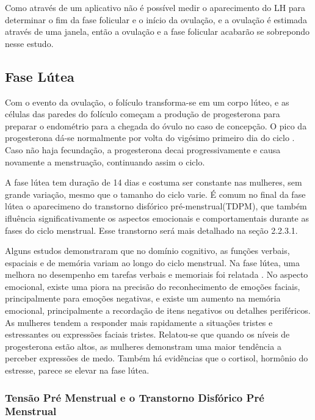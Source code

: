 Como através de um aplicativo não é possível medir o aparecimento do LH 
para determinar o fim da fase folicular e o início da ovulação, 
e a ovulação é estimada através de uma janela, então a ovulação e a fase 
folicular acabarão se sobrepondo nesse estudo.

\subsection{Fase Lútea}

Com o evento da ovulação, o folículo transforma-se em um corpo lúteo, e as 
células das paredes do folículo começam a produção de progesterona para 
preparar o endométrio para a chegada do óvulo no caso de concepção. 
O pico da progesterona dá-se normalmente por volta do vigésimo primeiro 
dia do ciclo \cite{nikas2003}. Caso não haja fecundação, a progesterona 
decai progressivamente e causa novamente a menstruação, continuando assim 
o ciclo.

A fase lútea tem duração de 14 dias e costuma ser constante nas mulheres, 
sem grande variação, mesmo que o tamanho do ciclo varie. É comum no final 
da fase lútea o aparecimeno do transtorno disfórico pré-menstrual(TDPM), 
que também ifluência significativamente os aspectos emocionais e 
comportamentais durante as fases do ciclo menstrual. Esse transtorno 
será mais detalhado na seção 2.2.3.1.

Alguns estudos demonstraram que no domínio cognitivo, as funções verbais, 
espaciais e de memória variam ao longo do ciclo menstrual. Na fase lútea, 
uma melhora no desempenho em tarefas verbais e memoriais foi relatada 
\cite{hausmann2000}. No aspecto emocional, existe uma piora na precisão 
do reconhecimento de emoções faciais, principalmente para emoções negativas, 
e existe um aumento na memória emocional, principalmente a recordação de 
itens negativos ou detalhes periféricos. As mulheres tendem a responder 
mais rapidamente a situações tristes e estressantes ou expressões faciais 
tristes. Relatou-se que quando os níveis de progesterona estão altos, as 
mulheres demonstram uma maior tendência a perceber expressões de medo. 
Também há evidências que o cortisol, hormônio do estresse, parece se elevar 
na fase lútea\cite{kirschbaum1999}.

\subsubsection{Tensão Pré Menstrual e o Transtorno Disfórico Pré Menstrual}

